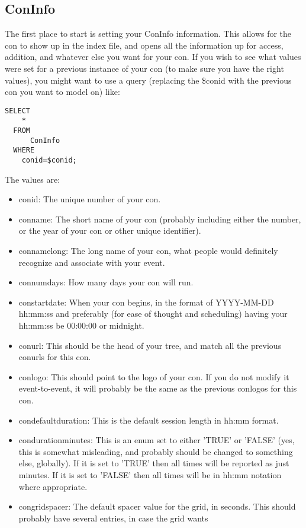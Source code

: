\documentclass[captions=tablesignature]{scrartcl}
\begin{document}
\subsection{ConInfo}
\label{sec-11-1}
The first place to start is setting your ConInfo information.  This
allows for the con to show up in the index file, and opens all the
information up for access, addition, and whatever else you want for
your con.  If you wish to see what values were set for a previous
instance of your con (to make sure you have the right values), you
might want to use a query (replacing the \$conid with the previous
con you want to model on) like:
\begin{verbatim}
SELECT
    *
  FROM
      ConInfo
  WHERE
    conid=$conid;
\end{verbatim}
The values are:
\begin{itemize}
\item conid: The unique number of your con.
\item conname: The short name of your con (probably including either
the number, or the year of your con or other unique identifier).
\item connamelong: The long name of your con, what people would
definitely recognize and associate with your event.
\item connumdays: How many days your con will run.
\item constartdate: When your con begins, in the format of YYYY-MM-DD
hh:mm:ss and preferably (for ease of thought and scheduling)
having your hh:mm:ss be 00:00:00 or midnight.
\item conurl: This should be the head of your tree, and match all the
previous conurls for this con.
\item conlogo: This should point to the logo of your con.  If you do
not modify it event-to-event, it will probably be the same as the
previous conlogos for this con.
\item condefaultduration: This is the default session length in hh:mm
format.
\item condurationminutes: This is an enum set to either 'TRUE' or
'FALSE' (yes, this is somewhat misleading, and probably should be
changed to something else, globally).  If it is set to 'TRUE'
then all times will be reported as just minutes.  If it is set to
'FALSE' then all times will be in hh:mm notation where
appropriate.
\item congridspacer: The default spacer value for the grid, in seconds.
This should probably have several entries, in case the grid wants

\end{itemize}
\end{document}
